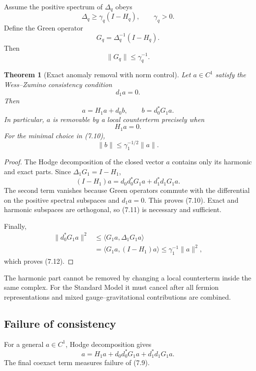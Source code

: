 \documentclass[11pt]{article}
\newtheorem{theorem}{Theorem}[section]
\theoremstyle{remark}
\begin{document}
Assume the positive spectrum of \(\Delta_q\) obeys
\[
 \Delta_q\ge\gamma_q(I-H_q),\qquad \gamma_q>0.              \tag{7.6}
\]
Define the Green operator
\[
 G_q=\Delta_q^{-1}(I-H_q).                                  \tag{7.7}
\]
Then
\[
                              \|G_q\|\le\gamma_q^{-1}.        \tag{7.8}
\]

\begin{theorem}[Exact anomaly removal with norm control]
\label{thm:v12v7-anomaly}
Let \(a\in C^1\) satisfy the Wess--Zumino consistency condition
\[
                              d_1a=0.                        \tag{7.9}
\]
Then
\[
                              a=H_1a+d_0b,\qquad
                              b=d_0^*G_1a.                  \tag{7.10}
\]
In particular, \(a\) is removable by a local counterterm precisely
when
\[
                              H_1a=0.                        \tag{7.11}
\]
For the minimal choice in (7.10),
\[
                              \|b\|\le\gamma_1^{-1/2}\|a\|.  \tag{7.12}
\]
\end{theorem}

\begin{proof}
The Hodge decomposition of the closed vector \(a\) contains only its
harmonic and exact parts.  Since \(\Delta_1G_1=I-H_1\),
\[
 (I-H_1)a=d_0d_0^*G_1a+d_1^*d_1G_1a.
\]
The second term vanishes because Green operators commute with the
differential on the positive spectral subspaces and \(d_1a=0\).
This proves (7.10).  Exact and harmonic subspaces are orthogonal, so
(7.11) is necessary and sufficient.

Finally,
\[
 \begin{split}
 \|d_0^*G_1a\|^2
 &\le\langle G_1a,\Delta_1G_1a\rangle\\
 &=\langle G_1a,(I-H_1)a\rangle
 \le\gamma_1^{-1}\|a\|^2,
 \end{split}
\]
which proves (7.12).
\end{proof}

The harmonic part cannot be removed by changing a local counterterm
inside the same complex.  For the Standard Model it must cancel after
all fermion representations and mixed gauge--gravitational
contributions are combined.

\subsection{Failure of consistency}

For a general \(a\in C^1\), Hodge decomposition gives
\[
 a=H_1a+d_0d_0^*G_1a+d_1^*d_1G_1a.                        \tag{7.13}
\]
The final coexact term measures failure of (7.9).
\end{document}
